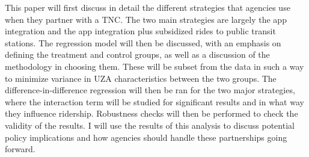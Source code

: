 \documentclass [11pt]{article}
\begin{document}
\indent This paper will first discuss in detail the different strategies that agencies use when they partner with a TNC. The two main strategies are largely the app integration and the app integration plus subsidized rides to public transit stations. The regression model will then be discussed, with an emphasis on defining the treatment and control groups, as well as a discussion of the methodology in choosing them. These will be subset from the data in such a way to minimize variance in UZA characteristics between the two groups. The difference-in-difference regression will then be ran for the two major strategies, where the interaction term will be studied for significant results and in what way they influence ridership. Robustness checks will then be performed to check the validity of the results. I will use the results of this analysis to discuss potential policy implications and how agencies should handle these partnerships going forward.


\nocite{*}
\newpage


\end{document}
